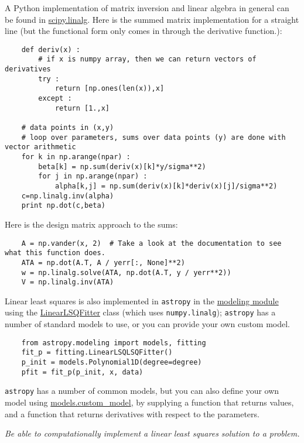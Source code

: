 \documentclass{article}
\newcommand{\test}[1]{%
    \begin{center}
        \colorbox{hl}{\parbox{0.9\textwidth}{\emph{#1}}}
    \end{center}}
\begin{document}
A Python implementation of matrix inversion and linear algebra in general
can be found in
\href{http://docs.scipy.org/doc/scipy/reference/tutorial/linalg.html}
{scipy.linalg}.
Here is the summed matrix implementation for a straight line
(but the functional form only comes in through the derivative function.):
\begin{verbatim}
    def deriv(x) :
        # if x is numpy array, then we can return vectors of derivatives
        try :
            return [np.ones(len(x)),x]
        except :
            return [1.,x]

    # data points in (x,y)
    # loop over parameters, sums over data points (y) are done with vector arithmetic
    for k in np.arange(npar) :
        beta[k] = np.sum(deriv(x)[k]*y/sigma**2)
        for j in np.arange(npar) :
            alpha[k,j] = np.sum(deriv(x)[k]*deriv(x)[j]/sigma**2)
    c=np.linalg.inv(alpha)
    print np.dot(c,beta)
\end{verbatim}
Here is the design matrix approach to the sums:
\begin{verbatim}
    A = np.vander(x, 2)  # Take a look at the documentation to see what this function does.
    ATA = np.dot(A.T, A / yerr[:, None]**2)
    w = np.linalg.solve(ATA, np.dot(A.T, y / yerr**2))
    V = np.linalg.inv(ATA)
\end{verbatim}
Linear least squares is also implemented in \texttt{astropy} in the
\href{http://astropy.readthedocs.org/en/v1.0.6/modeling/index.html}
{modeling module} using the
\href{http://astropy.readthedocs.org/en/v1.0.6/api/astropy.modeling.fitting.LinearLSQFitter.html#astropy.modeling.fitting.LinearLSQFitter}
{LinearLSQFitter} class (which uses {\tt numpy.linalg});
{\tt astropy} has a number of standard models to use,
or you can provide your own custom model.
\begin{verbatim}
    from astropy.modeling import models, fitting
    fit_p = fitting.LinearLSQLSQFitter()
    p_init = models.Polynomial1D(degree=degree)
    pfit = fit_p(p_init, x, data)
\end{verbatim}

{\tt astropy} has a number of common models, but you can also define your own
model using
\href{http://astronomy.nmsu.edu/holtz/a575/ay575notes/astropy.readthedocs.org/en/v1.0.6/api/astropy.modeling.custom_model.html#astropy.modeling.custom_model}
{models.custom\_model}, by supplying a function that returns
values, and a function that returns derivatives with respect to the
parameters.

\test{Be able to computationally implement a linear least squares solution
to a problem.}
\end{document}
